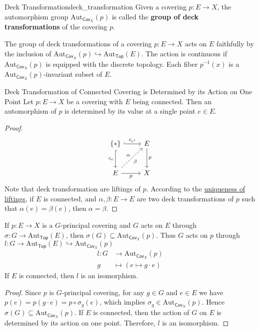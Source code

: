 \documentclass{report}
\begin{document}
\begin{definition}{Deck Transformation}{deck_transformation}
	Given a covering $p: E \rightarrow X$, the automorphism group $\mathrm{Aut}_{\mathsf{Cov}_X}(p)$ is called the \textbf{group of deck transformations} of the covering $p$.
\end{definition}

The group of deck transformations of a covering $p: E \rightarrow X$ acts on $E$ faithfully by the inclusion of $\mathrm{Aut}_{\mathsf{Cov}_X}(p)\hookrightarrow\mathrm{Aut}_{\mathsf{Top}}(E)$. The action is continuous if $\mathrm{Aut}_{\mathsf{Cov}_X}(p)$ is equipped with the discrete topology. Each fiber $p^{-1}(x)$ is a $\mathrm{Aut}_{\mathsf{Cov}_X}(p)$-invariant subset of $E$.


\begin{lemma}{Deck Transformation of Connected Covering is Determined by its Action on One Point}{}
	Let $p: E \rightarrow X$ be a covering with $E$ being connected. Then an automorphism of $p$ is determined by its value at a single point $e \in E$.
\end{lemma}
\begin{proof}
	\[
		\begin{tikzcd}[ampersand replacement=\&]
			\{*\} \arrow[r, "c_{e'}", hook] \arrow[d, "c_{e}"', hook]                      \& E \arrow[d, "p"] \\ [+8pt]
			E \arrow[r, "p"'] \arrow[ru, "\alpha", "\beta"', dashed] \& X
		\end{tikzcd}
	\]
	Note that deck transformation are liftings of $p$. According to the \hyperref[th:uniqueness_of_liftings]{uniqueness of liftings}, if $E$ is connected, and $\alpha,\beta:E\to E$ are two deck transformations of $p$ such that $\alpha(e)=\beta(e)$, then $\alpha=\beta$.
\end{proof}

\begin{proposition}{}{}
	If $p: E \rightarrow X$ is a $G$-principal covering and $G$ acts on $E$ through $\sigma:G\to \mathrm{Aut}_{\mathsf{Top}}(E)$, then $\sigma(G) \subseteq\mathrm{Aut}_{\mathsf{Cov}_X}(p)$. Thus $G$ acts on $p$ through $l:G\to \mathrm{Aut}_{\mathsf{Top}}(E) \hookrightarrow \mathrm{Aut}_{\mathsf{Cov}_X}(p)$
	\begin{align*}
		l:G & \longrightarrow \mathrm{Aut}_{\mathsf{Cov}_X}(p) \\
		g   & \longmapsto \left(e\mapsto g\cdot e\right)
	\end{align*}
	If $E$ is connected, then $l$ is an isomorphism.
\end{proposition}
\begin{proof}
	Since $p$ is $G$-principal covering, for any $g\in G$ and $e\in E$ we have $p(e)=p(g\cdot e)=p\circ \sigma_g(e)$, which implies $\sigma_g\in \mathrm{Aut}_{\mathsf{Cov}_X}(p)$. Hence $\sigma(G) \subseteq\mathrm{Aut}_{\mathsf{Cov}_X}(p)$. If $E$ is connected, then the action of $G$ on $E$ is determined by its action on one point. Therefore, $l$ is an isomorphism.
\end{proof}
\end{document}
